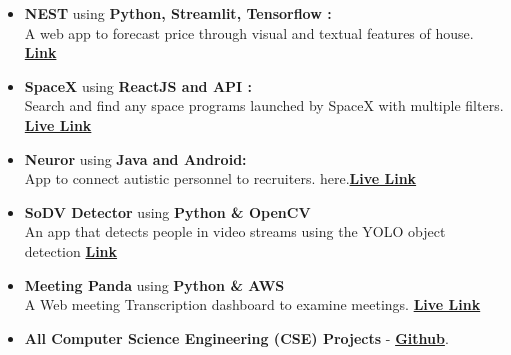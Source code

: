 \begin{itemize}
\item \textbf{\color{black}NEST} using \textbf{ \color{black}Python, Streamlit, Tensorflow :} \\A web app to forecast price through visual and textual features of house. \href{https://www.github.com/rajpratyush/NEST}{\color{black}\textbf{Link}}
\item \textbf{\color{black}SpaceX } using \textbf{ \color{black}ReactJS and API :} \\Search and find any space programs launched by SpaceX with multiple filters.  \href{https://fleo-spacex-task.herokuapp.com/}{\color{black}\textbf{Live Link}}
\item \textbf{\color{black}Neuror} using \textbf{ \color{black}Java and Android:}  \\App to connect autistic personnel to recruiters. here.\href{https://www.github.com/rajpratyush/NEST}{\color{black}\textbf{Live Link}}
\item \textbf{\color{black}SoDV Detector} using \textbf{\color{black} Python \& OpenCV}\\An app that detects people in video streams using the YOLO object detection \href{https://github.com/rajpratyush/Social-Distancing-Detector/}{\color{black}\textbf{Link}}
\item \textbf{\color{black}Meeting Panda} using \textbf{\color{black} Python \& AWS }\\A Web meeting Transcription dashboard to examine meetings. \href{http://meetingpandaenv-env.eba-8jquxvpt.ap-south-1.elasticbeanstalk.com/}{\color{black}\textbf{Live Link}}
\item \textbf{\color{black}All Computer Science Engineering (CSE) Projects} - \href{https://github.com/rajpratyush}{\color{black}\textbf{Github}}.
\end{itemize}



\medskip


